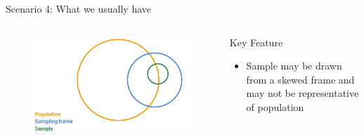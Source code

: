 \documentclass[aspectratio=169]{../latex_main/tntbeamer}  %
\begin{document}
	
		\begin{frame}{Scenario 4: What we usually have}
	    \begin{columns}
	        \begin{column}{.4\textwidth}
	           \begin{figure}
	               \includegraphics[scale=.35]{Bild6}
	           \end{figure}
	        \end{column}
	        
	        \begin{column}{.4\textwidth}
	            Key Feature
                \begin{itemize}
                    \item Sample may be drawn from a skewed frame and may not be representative of population
                \end{itemize}
	        \end{column}
	        
	    \end{columns}
	    
	\end{frame}
	
\end{document}
